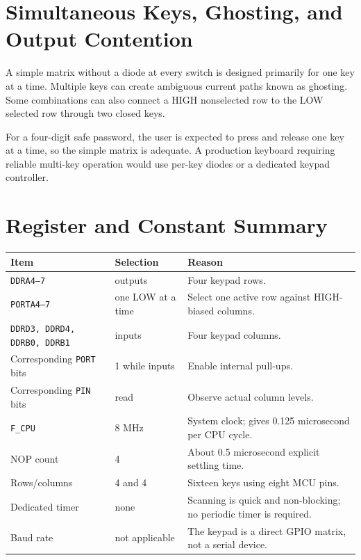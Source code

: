 \documentclass[11pt,a4paper]{article}
\begin{document}
\section{Simultaneous Keys, Ghosting, and Output Contention}
A simple matrix without a diode at every switch is designed primarily for one key at a time. Multiple keys can create ambiguous current paths known as ghosting. Some combinations can also connect a HIGH nonselected row to the LOW selected row through two closed keys.

For a four-digit safe password, the user is expected to press and release one key at a time, so the simple matrix is adequate. A production keyboard requiring reliable multi-key operation would use per-key diodes or a dedicated keypad controller.

\section{Register and Constant Summary}
\begin{longtable}{p{}p{}p{}}
\toprule
Item & Selection & Reason \\
\midrule
\endhead
\texttt{DDRA4--7} & outputs & Four keypad rows. \\
\texttt{PORTA4--7} & one LOW at a time & Select one active row against HIGH-biased columns. \\
\texttt{DDRD3, DDRD4, DDRB0, DDRB1} & inputs & Four keypad columns. \\
Corresponding \texttt{PORT} bits & 1 while inputs & Enable internal pull-ups. \\
Corresponding \texttt{PIN} bits & read & Observe actual column levels. \\
\texttt{F\_CPU} & 8 MHz & System clock; gives 0.125 microsecond per CPU cycle. \\
NOP count & 4 & About 0.5 microsecond explicit settling time. \\
Rows/columns & 4 and 4 & Sixteen keys using eight MCU pins. \\
Dedicated timer & none & Scanning is quick and non-blocking; no periodic timer is required. \\
Baud rate & not applicable & The keypad is a direct GPIO matrix, not a serial device. \\
\bottomrule
\end{longtable}
\end{document}
